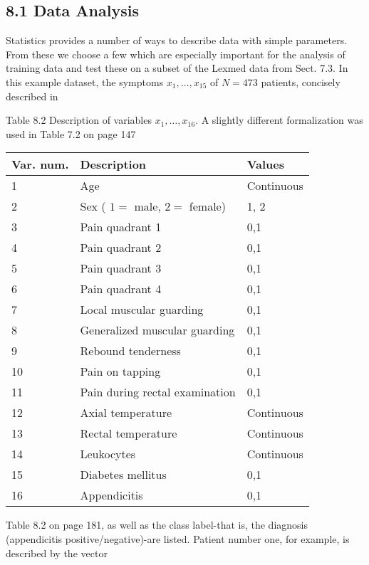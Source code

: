 \documentclass[10pt]{article}
\begin{document}
\subsection*{8.1 Data Analysis}
Statistics provides a number of ways to describe data with simple parameters. From these we choose a few which are especially important for the analysis of training data and test these on a subset of the Lexmed data from Sect. 7.3. In this example dataset, the symptoms $x_{1}, \ldots, x_{15}$ of $N=473$ patients, concisely described in

Table 8.2 Description of variables $x_{1}, \ldots, x_{16}$. A slightly different formalization was used in Table 7.2 on page 147

\begin{center}
\begin{tabular}{|l|l|l|}
\hline
Var. num. & Description & Values \\
\hline
1 & Age & Continuous \\
\hline
2 & Sex ( $1=$ male, $2=$ female) & 1, 2 \\
\hline
3 & Pain quadrant 1 & 0,1 \\
\hline
4 & Pain quadrant 2 & 0,1 \\
\hline
5 & Pain quadrant 3 & 0,1 \\
\hline
6 & Pain quadrant 4 & 0,1 \\
\hline
7 & Local muscular guarding & 0,1 \\
\hline
8 & Generalized muscular guarding & 0,1 \\
\hline
9 & Rebound tenderness & 0,1 \\
\hline
10 & Pain on tapping & 0,1 \\
\hline
11 & Pain during rectal examination & 0,1 \\
\hline
12 & Axial temperature & Continuous \\
\hline
13 & Rectal temperature & Continuous \\
\hline
14 & Leukocytes & Continuous \\
\hline
15 & Diabetes mellitus & 0,1 \\
\hline
16 & Appendicitis & 0,1 \\
\hline
\end{tabular}
\end{center}

Table 8.2 on page 181, as well as the class label-that is, the diagnosis (appendicitis positive/negative)-are listed. Patient number one, for example, is described by the vector
\end{document}
